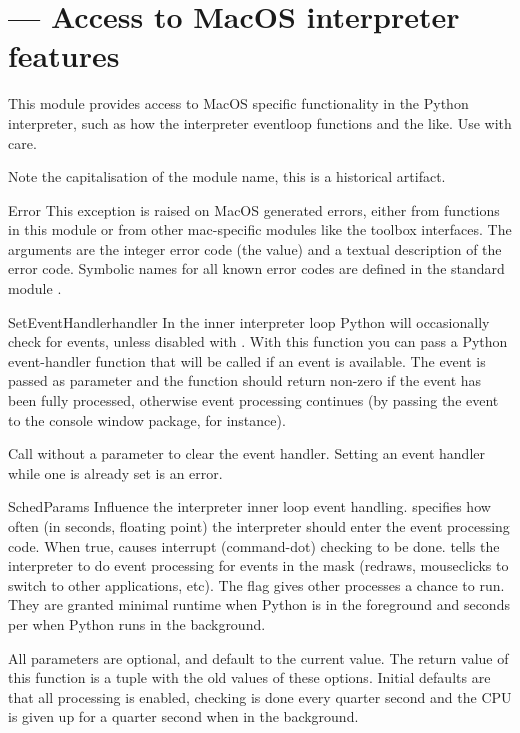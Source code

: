 \section{ ---
         Access to MacOS interpreter features}



This module provides access to MacOS specific functionality in the
Python interpreter, such as how the interpreter eventloop functions
and the like. Use with care.

Note the capitalisation of the module name, this is a historical
artifact.

\begin{excdesc}{Error}
This exception is raised on MacOS generated errors, either from
functions in this module or from other mac-specific modules like the
toolbox interfaces. The arguments are the integer error code (the
 value) and a textual description of the error code.
Symbolic names for all known error codes are defined in the standard
module .
\end{excdesc}

\begin{funcdesc}{SetEventHandler}{handler}
In the inner interpreter loop Python will occasionally check for events,
unless disabled with . With this function you
can pass a Python event-handler function that will be called if an event
is available. The event is passed as parameter and the function should return
non-zero if the event has been fully processed, otherwise event processing
continues (by passing the event to the console window package, for instance).

Call  without a parameter to clear the
event handler. Setting an event handler while one is already set is an
error.
\end{funcdesc}

\begin{funcdesc}{SchedParams}{}
Influence the interpreter inner loop event handling. 
specifies how often (in seconds, floating point) the interpreter
should enter the event processing code. When true,  causes
interrupt (command-dot) checking to be done.  tells the
interpreter to do event processing for events in the mask (redraws,
mouseclicks to switch to other applications, etc). The 
flag gives other processes a chance to run. They are granted minimal
runtime when Python is in the foreground and  seconds per
 when Python runs in the background.

All parameters are optional, and default to the current value. The return
value of this function is a tuple with the old values of these options.
Initial defaults are that all processing is enabled, checking is done every
quarter second and the CPU is given up for a quarter second when in the
background.
\end{funcdesc}

